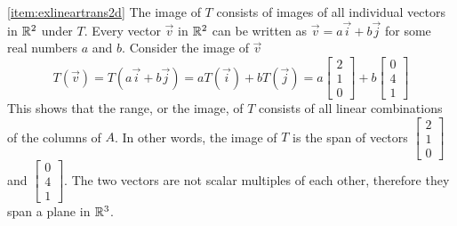 \documentclass{ximera}
\begin{document}
\begin{example}
\begin{explanation}
\ref{item:exlineartrans2d}  The image of $T$ consists of images of all individual vectors in $\mathbb{R}^2$ under $T$.  Every vector $\vec{v}$  in $\mathbb{R}^2$ can be written as $\vec{v}=a\vec{i}+b\vec{j}$ for some real numbers  $a$ and $b$.  Consider the image of $\vec{v}$
$$T(\vec{v})=T(a\vec{i}+b\vec{j})=aT(\vec{i})+bT(\vec{j})=a\begin{bmatrix}2\\1\\0\end{bmatrix}+b\begin{bmatrix}0\\4\\1\end{bmatrix}$$
This shows that the range, or the image, of $T$ consists of all linear combinations of the columns of $A$.  In other words, the image of $T$ is the span of vectors $\begin{bmatrix}2\\1\\0\end{bmatrix}$ and $\begin{bmatrix}0\\4\\1\end{bmatrix}$. The two vectors are not scalar multiples of each other, therefore they span a plane in $\mathbb{R}^3$.
\end{explanation}  
\end{example}
 
\end{document}
